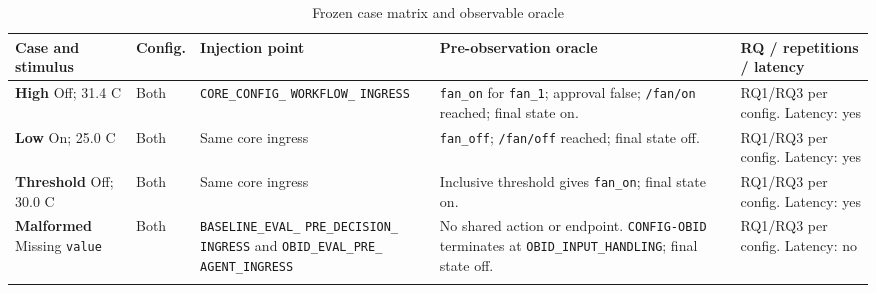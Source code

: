 \begin{table}[H]
\centering
\caption{Frozen case matrix and observable oracle}
\label{tab:method-cases}

\begingroup
\footnotesize
\setlength{\tabcolsep}{2.5pt}
\renewcommand{\arraystretch}{1.12}

\begin{tabularx}{\textwidth}{
  @{}
  L{0.18\textwidth}
  L{0.105\textwidth}
  L{0.215\textwidth}
  Y
  L{0.145\textwidth}
  @{}
}
\toprule
\textbf{Case and stimulus}
&
\textbf{Config.}
&
\textbf{Injection point}
&
\textbf{Pre-observation oracle}
&
\textbf{RQ / repetitions / latency}
\\
\midrule

\textbf{High}\newline
Off; 31.4 C
&
Both
&
\texttt{CORE\_CONFIG\_}\newline
\texttt{WORKFLOW\_}\newline
\texttt{INGRESS}
&
\texttt{fan\_on} for \texttt{fan\_1}; approval false;
\texttt{/fan/on} reached; final state on.
&
RQ1/RQ3 per config.\newline
Latency: yes
\\
\addlinespace[1.5pt]

\textbf{Low}\newline
On; 25.0 C
&
Both
&
Same core ingress
&
\texttt{fan\_off}; \texttt{/fan/off} reached; final state off.
&
RQ1/RQ3 per config.\newline
Latency: yes
\\
\addlinespace[1.5pt]

\textbf{Threshold}\newline
Off; 30.0 C
&
Both
&
Same core ingress
&
Inclusive threshold gives \texttt{fan\_on}; final state on.
&
RQ1/RQ3 per config.\newline
Latency: yes
\\
\addlinespace[1.5pt]

\textbf{Malformed}\newline
Missing \texttt{value}
&
Both
&
\texttt{BASELINE\_EVAL\_}\newline
\texttt{PRE\_DECISION\_}\newline
\texttt{INGRESS}\newline
and\newline
\texttt{OBID\_EVAL\_PRE\_}\newline
\texttt{AGENT\_INGRESS}
&
No shared action or endpoint. \texttt{CONFIG-OBID} terminates at
\texttt{OBID\_INPUT\_HANDLING}; final state off.
&
RQ1/RQ3 per config.\newline
Latency: no
\\
\addlinespace[1.5pt]


\end{tabularx}
\end{table}
